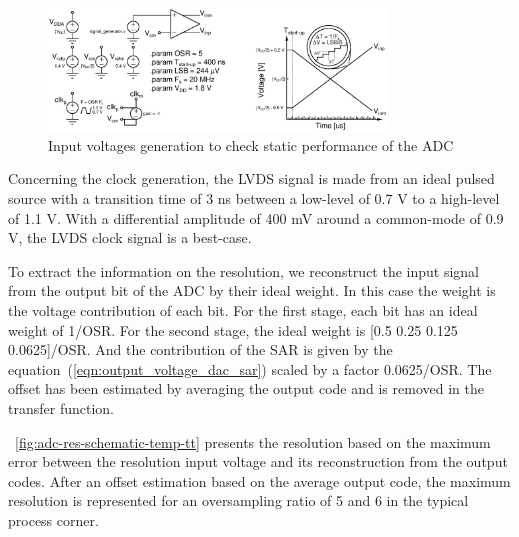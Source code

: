 \begin{figure}[htp]
    \centering
    \includegraphics[width=0.8\textwidth]{Chapter5/Figs/adc_chip/input_signal_generator.ps}
    \caption{Input voltages generation to check static performance of the ADC}
    \label{fig:tb_adc_stimuli}
\end{figure}

Concerning the clock generation, the LVDS signal is made from an ideal pulsed source with a transition time of 3 ns between a low-level of 0.7 V to a high-level of 1.1 V. With a differential amplitude of 400 mV around a common-mode of 0.9 V, the LVDS clock signal is a best-case.

To extract the information on the resolution, we reconstruct the input signal from the output bit of the ADC by their ideal weight. In this case the weight is the voltage contribution of each bit. For the first stage, each bit has an ideal weight of 1/OSR. For the second stage, the ideal weight is [0.5 0.25 0.125 0.0625]/OSR. And the contribution of the SAR is given by the equation~(\ref{eqn:output_voltage_dac_sar}) scaled by a factor 0.0625/OSR\@. The offset has been estimated by averaging the output code and is removed in the transfer function.

\figurename~\ref{fig:adc-res-schematic-temp-tt} presents the resolution based on the maximum error between the resolution input voltage and its reconstruction from the output codes. After an offset estimation based on the average output code, the maximum resolution is represented for an oversampling ratio of 5 and 6 in the typical process corner.

